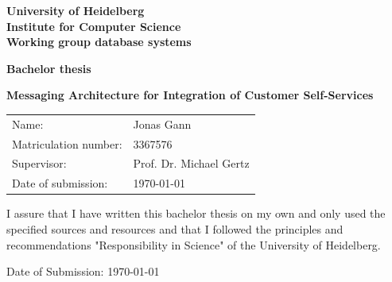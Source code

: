 \documentclass[
     12pt,         %
     a4paper,      %
     BCOR=10mm,version=first,     %
     DIV=14,version=first,        %
     ]{scrreprt}
\begin{document}
\begin{titlepage}
     \vspace*{1cm}
     \begin{center}
          \vspace*{3cm}
          \textbf
          {
               \Large University of Heidelberg\\
               \smallskip
               \Large Institute for Computer Science\\
               \smallskip
               \Large Working group database systems\\
               \smallskip
          }

          \vspace{3cm}

          \textbf{\large Bachelor thesis}

          \vspace{0.5\baselineskip}
          {
               \huge
               \textbf{Messaging Architecture for Integration of Customer Self-Services}
          }

     \end{center}

     \vfill
     {
          \large
          \begin{tabular}[l]{ll}
               Name:                 & Jonas Gann              \\
               Matriculation number: & 3367576                 \\
               Supervisor:           & Prof. Dr. Michael Gertz \\
               Date of submission:   & \today
          \end{tabular}
     }

\end{titlepage}

\onehalfspacing

\thispagestyle{empty}

\vspace*{100pt}
\noindent
I assure that I have written this bachelor thesis on my own and only used the specified sources and resources and that I followed the principles and recommendations "Responsibility in Science" of the University of Heidelberg.

\vspace*{50pt}
\noindent

\underline{\phantom{mmmmmmmmmmmmmmmmmmmm}}

\medskip
\noindent
Date of Submission: \today
\newpage
\end{document}

